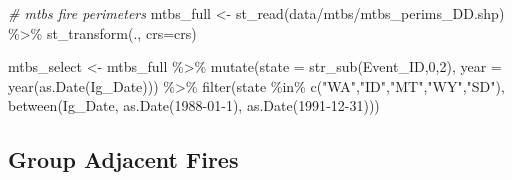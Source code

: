 \documentclass[
]{book}
\newenvironment{Shaded}{\begin{snugshade}}{\end{snugshade}}
\newcommand{\AttributeTok}[1]{\textcolor[rgb]{0.77,0.63,0.00}{#1}}
\newcommand{\CommentTok}[1]{\textcolor[rgb]{0.56,0.35,0.01}{\textit{#1}}}
\newcommand{\DecValTok}[1]{\textcolor[rgb]{0.00,0.00,0.81}{#1}}
\newcommand{\FunctionTok}[1]{\textcolor[rgb]{0.00,0.00,0.00}{#1}}
\newcommand{\NormalTok}[1]{#1}
\newcommand{\OtherTok}[1]{\textcolor[rgb]{0.56,0.35,0.01}{#1}}
\newcommand{\SpecialCharTok}[1]{\textcolor[rgb]{0.00,0.00,0.00}{#1}}
\newcommand{\StringTok}[1]{\textcolor[rgb]{0.31,0.60,0.02}{#1}}
\begin{document}
\begin{Shaded}
\begin{Highlighting}[]
\CommentTok{\# mtbs fire perimeters}
\NormalTok{mtbs\_full }\OtherTok{\textless{}{-}} \FunctionTok{st\_read}\NormalTok{(}\StringTok{\textquotesingle{}data/mtbs/mtbs\_perims\_DD.shp\textquotesingle{}}\NormalTok{) }\SpecialCharTok{\%\textgreater{}\%} 
  \FunctionTok{st\_transform}\NormalTok{(., }\AttributeTok{crs=}\NormalTok{crs)}

\NormalTok{mtbs\_select }\OtherTok{\textless{}{-}}\NormalTok{ mtbs\_full }\SpecialCharTok{\%\textgreater{}\%} 
  \FunctionTok{mutate}\NormalTok{(}\AttributeTok{state =} \FunctionTok{str\_sub}\NormalTok{(Event\_ID,}\DecValTok{0}\NormalTok{,}\DecValTok{2}\NormalTok{),}
         \AttributeTok{year =} \FunctionTok{year}\NormalTok{(}\FunctionTok{as.Date}\NormalTok{(Ig\_Date))) }\SpecialCharTok{\%\textgreater{}\%} 
  \FunctionTok{filter}\NormalTok{(state }\SpecialCharTok{\%in\%} \FunctionTok{c}\NormalTok{(}\StringTok{"WA"}\NormalTok{,}\StringTok{"ID"}\NormalTok{,}\StringTok{"MT"}\NormalTok{,}\StringTok{"WY"}\NormalTok{,}\StringTok{"SD"}\NormalTok{),}
         \FunctionTok{between}\NormalTok{(Ig\_Date, }\FunctionTok{as.Date}\NormalTok{(}\StringTok{\textquotesingle{}1988{-}01{-}1\textquotesingle{}}\NormalTok{), }\FunctionTok{as.Date}\NormalTok{(}\StringTok{\textquotesingle{}1991{-}12{-}31\textquotesingle{}}\NormalTok{))) }
\end{Highlighting}
\end{Shaded}

\hypertarget{group-adjacent-fires}{%
\subsection{Group Adjacent Fires}\label{group-adjacent-fires}}
\end{document}
